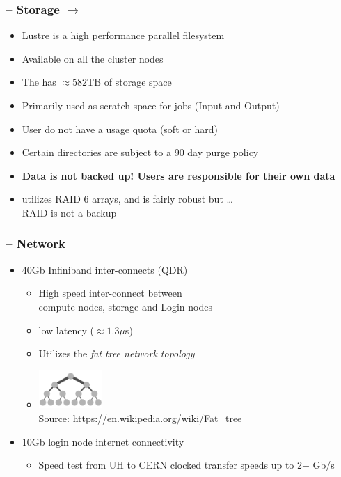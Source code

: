 \begin{frame}
	\frametitle{{\craycs} -- Storage $\rightarrow$ {\lustre}}
	\begin{itemize}
        \item Lustre is a high performance parallel filesystem 
        \item Available on all the cluster nodes

	\item The {\craycs} has $\approx582$TB of storage space

		\item Primarily used as scratch space for jobs (Input and Output)
		\item User do not have a usage quota (soft or hard)
		\item Certain directories are subject to a 90 day purge policy
		\item \textbf{Data is not backed up!  Users are responsible for their own data}
                \item {\lustre} utilizes RAID 6 arrays, and is fairly robust but \ldots~\\RAID is not a backup


	\end{itemize}
\end{frame}



\begin{frame}
	\frametitle{{\craycs} -- Network}
	\begin{itemize}
		\item 40Gb Infiniband inter-connects (QDR)
		\begin{itemize}
			\item High speed inter-connect between~\\compute nodes, {\lustre} storage and Login nodes
                        \item low latency ($\approx1.3\mu$s)
			\item Utilizes the \emph{fat tree network topology}
			\item[] \includegraphics[width=0.20\textwidth]{images/Fat_tree_network} \\[-1ex] {\fontsize{3}{4} \selectfont Source: \url{https://en.wikipedia.org/wiki/Fat_tree} } 		
		\end{itemize}
		\item 10Gb login node internet connectivity
		\begin{itemize}
			\item Speed test from UH to CERN clocked transfer speeds up to 2$+$ Gb/s
		\end{itemize}	
	\end{itemize}
\end{frame}

